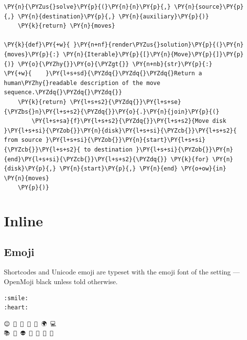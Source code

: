 \documentclass[a4paper,twoside]{article}
\begin{document}
\begin{tscode}[lang=python, engine=pygments]
\begin{Verbatim}[commandchars=\\\{\},breaklines, breakanywhere, commandchars=\\\{\}]
    \PY{n}{\PYZus{}solve}\PY{p}{(}\PY{n}{n}\PY{p}{,} \PY{n}{source}\PY{p}{,} \PY{n}{destination}\PY{p}{,} \PY{n}{auxiliary}\PY{p}{)}
    \PY{k}{return} \PY{n}{moves}

\PY{k}{def}\PY{+w}{ }\PY{n+nf}{render\PYZus{}solution}\PY{p}{(}\PY{n}{moves}\PY{p}{:} \PY{n}{Iterable}\PY{p}{[}\PY{n}{Move}\PY{p}{]}\PY{p}{)} \PY{o}{\PYZhy{}}\PY{o}{\PYZgt{}} \PY{n+nb}{str}\PY{p}{:}
\PY{+w}{    }\PY{l+s+sd}{\PYZdq{}\PYZdq{}\PYZdq{}Return a human\PYZhy{}readable description of the move sequence.\PYZdq{}\PYZdq{}\PYZdq{}}
    \PY{k}{return} \PY{l+s+s2}{\PYZdq{}}\PY{l+s+se}{\PYZbs{}n}\PY{l+s+s2}{\PYZdq{}}\PY{o}{.}\PY{n}{join}\PY{p}{(}
        \PY{l+s+sa}{f}\PY{l+s+s2}{\PYZdq{}}\PY{l+s+s2}{Move disk }\PY{l+s+si}{\PYZob{}}\PY{n}{disk}\PY{l+s+si}{\PYZcb{}}\PY{l+s+s2}{ from source }\PY{l+s+si}{\PYZob{}}\PY{n}{start}\PY{l+s+si}{\PYZcb{}}\PY{l+s+s2}{ to destination }\PY{l+s+si}{\PYZob{}}\PY{n}{end}\PY{l+s+si}{\PYZcb{}}\PY{l+s+s2}{\PYZdq{}} \PY{k}{for} \PY{n}{disk}\PY{p}{,} \PY{n}{start}\PY{p}{,} \PY{n}{end} \PY{o+ow}{in} \PY{n}{moves}
    \PY{p}{)}
\end{Verbatim}
\end{tscode}
\section{Inline}
\subsection{Emoji}
Shortcodes and Unicode emoji are typeset with the emoji font of the  setting --- OpenMoji black unless told otherwise.
\begin{tscode}[lang=md, engine=pygments]
\begin{Verbatim}[commandchars=\\\{\},breaklines, breakanywhere, commandchars=\\\{\}]
:smile:
:heart:
\end{Verbatim}
\end{tscode}
\begin{displayquote}
\end{displayquote}
\begin{tscode}[lang=md, engine=pygments]
\begin{Verbatim}[commandchars=\\\{\},breaklines, breakanywhere, commandchars=\\\{\}]
😊 🚀 🍕 🎉 🐍 🌍 💻
📚 🎨 👽 👋 🤖 🦄 🧠
\end{Verbatim}
\end{tscode}
\begin{displayquote}
      
      
\end{displayquote}
\end{document}
